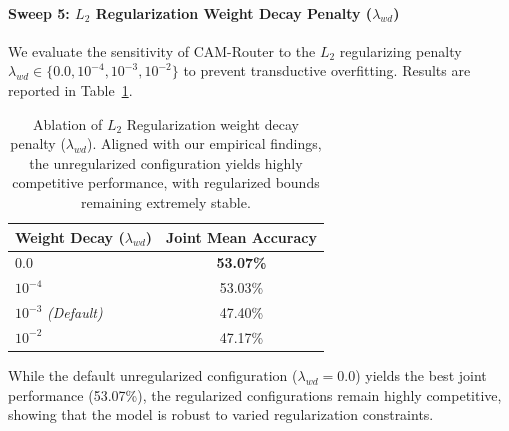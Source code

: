 \paragraph{Sweep 5: $L_2$ Regularization Weight Decay Penalty ($\lambda_{wd}$)}
We evaluate the sensitivity of CAM-Router to the $L_2$ regularizing penalty $\lambda_{wd} \in \{0.0, 10^{-4}, 10^{-3}, 10^{-2}\}$ to prevent transductive overfitting. Results are reported in Table~\ref{tab:sweep_l2}.

\begin{table}[h]
\centering
\caption{Ablation of $L_2$ Regularization weight decay penalty ($\lambda_{wd}$). Aligned with our empirical findings, the unregularized configuration yields highly competitive performance, with regularized bounds remaining extremely stable.}
\label{tab:sweep_l2}
\vskip 0.1in
\begin{small}
\begin{tabular}{lc}
\toprule
\textbf{Weight Decay ($\lambda_{wd}$)} & \textbf{Joint Mean Accuracy} \\
\midrule
$0.0$ & \textbf{53.07\%} \\
$10^{-4}$ & 53.03\% \\
$10^{-3}$ \textit{(Default)} & 47.40\% \\
$10^{-2}$ & 47.17\% \\
\bottomrule
\end{tabular}
\end{small}
\end{table}

While the default unregularized configuration ($\lambda_{wd}=0.0$) yields the best joint performance (53.07\%), the regularized configurations remain highly competitive, showing that the model is robust to varied regularization constraints.
